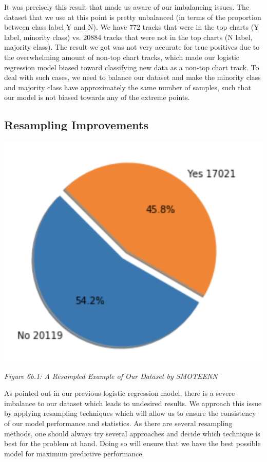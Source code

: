\documentclass[12pt,journal]{IEEEtran}
\begin{document}
 It was precisely this result that made us aware of our imbalancing issues. The dataset that we use at this point is pretty unbalanced (in terms of the proportion between class label Y and N). We have 772 tracks that were in the top charts (Y label, minority class) vs. 20884 tracks that were not in the top charts (N label, majority class). The result we got was not very accurate for true positives due to the overwhelming amount of  non-top chart tracks, which made our logistic regression model biased toward classifying new data as a non-top chart track. To deal with such cases, we need to balance our dataset and make the minority class and majority class have approximately the same number of samples, such that our model is not biased towards any of the extreme points.

\subsection{Resampling Improvements}
\begin{center}
	\includegraphics[width=.8\linewidth]{p4}
	
	\textit{Figure 6b.1: A Resampled Example of Our Dataset by SMOTEENN}
\end{center}
As pointed out in our previous logistic regression model, there is a severe imbalance to our dataset which leads to undesired results. We approach this issue by applying resampling techniques which will allow us to ensure the consistency of our model performance and statistics. As there are several resampling methods, one should always try several approaches and decide which technique is best for the problem at hand. Doing so will ensure that we have the best possible model for maximum predictive performance.
\end{document}
